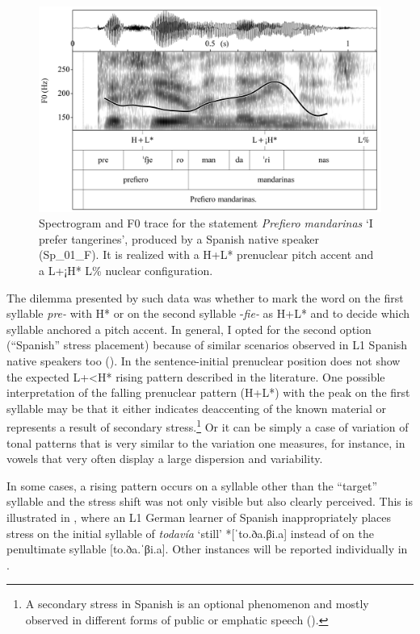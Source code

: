 \begin{figure}[p]
\includegraphics[width=.9\textwidth]{figures/a03HabilMethodology-img006-new.png}
\caption{Spectrogram and F0 trace for the statement \textit{Prefiero mandarinas} ‘I prefer tangerines’, produced by a Spanish native speaker (Sp\_01\_F). It is realized with a H+L* prenuclear pitch accent and a L+¡H* L\% nuclear configuration.}
\label{fig:3.6}
\end{figure}



The dilemma presented by such data was whether to mark the word on the first syllable \textit{pre-} with H* or on the second syllable -\textit{fie-} as H+L* and to decide which syllable anchored a pitch accent. In general, I opted for the second option (“Spanish” stress placement) because of similar scenarios observed in L1 Spanish native speakers too (). In  the sentence-initial prenuclear position does not show the expected L+<H* rising pattern described in the literature. One possible interpretation of the falling prenuclear pattern (H+L*) with the peak on the first syllable may be that it either indicates deaccenting of the known material or represents a result of secondary stress.\footnote{A secondary stress in Spanish is an optional phenomenon and mostly observed in different forms of public or emphatic speech (\citealt{Hualde2007,Hualde2009, Hualde2010}).} Or it can be simply a case of variation of tonal patterns that is very similar to the variation one measures, for instance, in vowels that very often display a large dispersion and variability.


In some cases, a rising pattern occurs on a syllable other than the “target” syllable and the stress shift was not only visible but also clearly perceived. This is illustrated in , where an L1 German learner of Spanish inappropriately places stress on the initial syllable of \textit{todavía} ‘still’ *[ˈto.ða.βi.a] instead of on the penultimate syllable [to.ða.ˈβi.a]. Other instances will be reported individually in .




